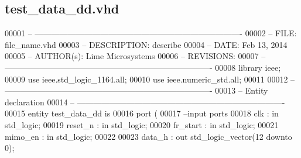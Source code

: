 \subsection{test\+\_\+data\+\_\+dd.\+vhd}
\label{rx__path__top_2diq2fifo_2synth_2test__data__dd_8vhd_source}

\begin{DoxyCode}
00001 \textcolor{keyword}{-- ---------------------------------------------------------------------------- }
00002 \textcolor{keyword}{-- FILE:    file\_name.vhd}
00003 \textcolor{keyword}{-- DESCRIPTION: describe}
00004 \textcolor{keyword}{-- DATE:    Feb 13, 2014}
00005 \textcolor{keyword}{-- AUTHOR(s):   Lime Microsystems}
00006 \textcolor{keyword}{-- REVISIONS:}
00007 \textcolor{keyword}{-- ---------------------------------------------------------------------------- }
00008 \textcolor{vhdlkeyword}{library }\textcolor{keywordflow}{ieee};
00009 \textcolor{vhdlkeyword}{use }ieee.std\_logic\_1164.\textcolor{keywordflow}{all};
00010 \textcolor{vhdlkeyword}{use }ieee.numeric\_std.\textcolor{keywordflow}{all};
00011 
00012 \textcolor{keyword}{-- ----------------------------------------------------------------------------}
00013 \textcolor{keyword}{-- Entity declaration}
00014 \textcolor{keyword}{-- ----------------------------------------------------------------------------}
00015 \textcolor{keywordflow}{entity }test_data_dd \textcolor{keywordflow}{is}
00016   \textcolor{keywordflow}{port} \textcolor{vhdlchar}{(}
00017 \textcolor{keyword}{        --input ports }
00018         \textcolor{vhdlchar}{clk}       \textcolor{vhdlchar}{:} \textcolor{keywordflow}{in} \textcolor{comment}{std\_logic};
00019         \textcolor{vhdlchar}{reset_n}   \textcolor{vhdlchar}{:} \textcolor{keywordflow}{in} \textcolor{comment}{std\_logic};
00020             \textcolor{vhdlchar}{fr_start}     \textcolor{vhdlchar}{:} \textcolor{keywordflow}{in} \textcolor{comment}{std\_logic};
00021             \textcolor{vhdlchar}{mimo_en}   \textcolor{vhdlchar}{:} \textcolor{keywordflow}{in} \textcolor{comment}{std\_logic};
00022           
00023             \textcolor{vhdlchar}{data_h}        \textcolor{vhdlchar}{:} \textcolor{keywordflow}{out} \textcolor{comment}{std\_logic\_vector}\textcolor{vhdlchar}{(}\textcolor{vhdllogic}{}\textcolor{vhdllogic}{12} \textcolor{keywordflow}{downto} \textcolor{vhdllogic}{}\textcolor{vhdllogic}{0}\textcolor{vhdlchar}{)};

\end{DoxyCode}
